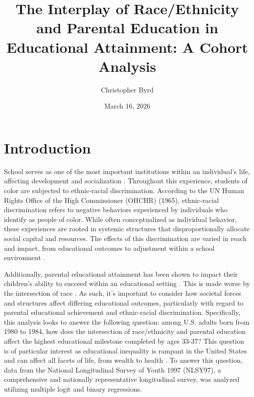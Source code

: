 \documentclass[jou,12pt,floatsintext]{apa7}
\title{The Interplay of Race/Ethnicity and Parental Education in Educational Attainment: A Cohort Analysis} %
\author{Christopher Byrd}
\date{March 16, 2026}
\begin{document}
\maketitle %

\section{Introduction}

School serves as one of the most important institutions within an individual's life, affecting development and socialization \parencite[p.551-555]{conley_you_2019}. Throughout this experience, students of color are subjected to ethnic-racial discrimination. According to the UN Human Rights Office of the High Commissioner (OHCHR) (1965), ethnic-racial discrimination refers to negative behaviors experienced by individuals who identify as people of color. While often conceptualized as individual behavior, these experiences are rooted in systemic structures that disproportionally allocate social capital and resources. The effects of this discrimination are varied in reach and impact, from educational outcomes to adjustment within a school environment \parencite{bottiani_multilevel_2017, del_toro_when_2024, pearman_collective_2022}.

Additionally, parental educational attainment has been shown to impact their children's ability to succeed within an educational setting \parencite{assari_parental_2018,oakes_multiplying_1990,reed_educational_nodate}. This is made worse by the intersection of race \parencite{assari_parental_2018}. As such, it's important to consider how societal forces and structures affect differing educational outcomes, particularly with regard to parental educational achievement and ethnic-racial discrimination. Specifically, this analysis looks to answer the following question: among U.S. adults born from 1980 to 1984, how does the intersection of race/ethnicity and parental education affect the highest educational milestone completed by ages 33-37? This question is of particular interest as educational inequality is rampant in the United States and can affect all facets of life, from wealth to health \parencite{zajacova_relationship_2018, lurie_mechanisms_2021}. To answer this question, data from the National Longitudinal Survey of Youth 1997 (NLSY97), a comprehensive and nationally representative longitudinal survey, was analyzed utilizing multiple logit and binary regressions.
\end{document}
